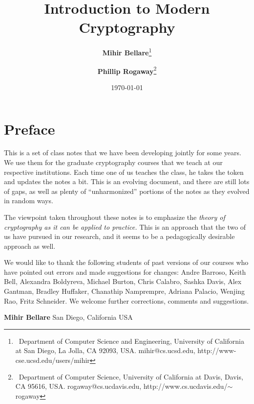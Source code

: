 \documentclass[11pt,twoside]{book}
\begin{document}

\title{Introduction to Modern Cryptography}

\author{\textbf{Mihir Bellare}\thanks{\ 
Department of Computer Science and Engineering,
University of California at San Diego,
La Jolla, CA 92093, USA.  mihir@cs.ucsd.edu, http://www-cse.ucsd.edu/users/mihir}
\and
\textbf{Phillip Rogaway}\thanks{\
Department of Computer Science,
University of California at Davis,
Davis, CA 95616, USA. rogaway@cs.ucdavis.edu, http://www.cs.ucdavis.edu/$\sim$rogaway
}\vspace{0.3in}}

\date{\today}


\maketitle

\section*{Preface}

\vspace{0.3in}

This is a set of class notes that we have been developing jointly for some
years.  We use them for the graduate cryptography courses that we teach at our
respective institutions. Each time one of us teaches the class, he takes the
token and updates the notes a bit.  This is an evolving document, and there are
still lots of gaps, as well as plenty of ``unharmonized'' portions of the notes
as they evolved in random ways.

The viewpoint taken throughout these notes is to emphasize the \textit{theory
of cryptography as it can be applied to practice.}  This is an approach that
the two of us have pursued in our research, and it seems to be a pedagogically
desirable approach as well.

We would like to thank the following students of past versions of our courses
who have pointed out errors and made suggestions for changes: Andre Barroso,
Keith Bell, Alexandra Boldyreva, Michael Burton, Chris Calabro, Sashka Davis,
Alex Gantman, Bradley Huffaker, Chanathip Namprempre, Adriana Palacio, Wenjing
Rao, Fritz Schneider.  We welcome further corrections, comments and
suggestions.

\vspace{0.7in}

\noindent \textbf{Mihir Bellare} \hfill San Diego, California USA
\end{document}
